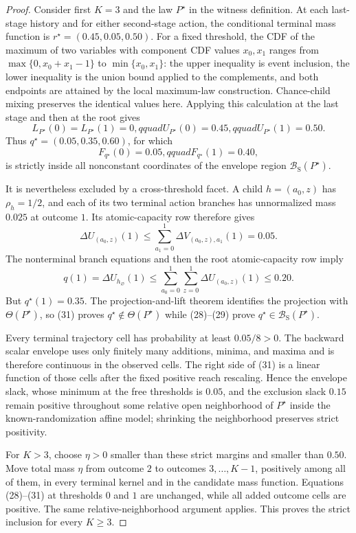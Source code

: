 \documentclass{article}
\begin{document}
\begin{proof}
Consider first \(K=3\) and the law \(P^\star\) in the witness definition.  At each last-stage history and for either second-stage action, the conditional terminal mass function is \(r^\star=(0.45,0.05,0.50)\).  For a fixed threshold, the CDF of the maximum of two variables with component CDF values \(x_0,x_1\) ranges from \(\max\{0,x_0+x_1-1\}\) to \(\min\{x_0,x_1\}\): the upper inequality is event inclusion, the lower inequality is the union bound applied to the complements, and both endpoints are attained by the local maximum-law construction.  Chance-child mixing preserves the identical values here.  Applying this calculation at the last stage and then at the root gives
\[
 L_{P^\star}(0)=L_{P^\star}(1)=0,qquad
 U_{P^\star}(0)=0.45,qquad U_{P^\star}(1)=0.50.          \tag{28}
\]
Thus \(q^\star=(0.05,0.35,0.60)\), for which
\[
 F_{q^\star}(0)=0.05,qquad F_{q^\star}(1)=0.40,          \tag{29}
\]
is strictly inside all nonconstant coordinates of the envelope region \(\mathcal B_{\mathrm S}(P^\star)\).

It is nevertheless excluded by a cross-threshold facet.  A child \(h=(a_0,z)\) has \(\rho_h=1/2\), and each of its two terminal action branches has unnormalized mass \(0.025\) at outcome \(1\).  Its atomic-capacity row therefore gives
\[
 \Delta U_{(a_0,z)}(1)
 \leq\sum_{a_1=0}^1\Delta V_{(a_0,z),a_1}(1)=0.05.        \tag{30}
\]
The nonterminal branch equations and then the root atomic-capacity row imply
\[
 q(1)=\Delta U_{h_\varnothing}(1)
 \leq\sum_{a_0=0}^1\sum_{z=0}^1
       \Delta U_{(a_0,z)}(1)
 \leq0.20.                                                \tag{31}
\]
But \(q^\star(1)=0.35\).  The projection-and-lift theorem identifies the projection with \(\Theta(P^\star)\), so (31) proves \(q^\star\notin\Theta(P^\star)\) while (28)--(29) prove \(q^\star\in\mathcal B_{\mathrm S}(P^\star)\).

Every terminal trajectory cell has probability at least \(0.05/8>0\).  The backward scalar envelope uses only finitely many additions, minima, and maxima and is therefore continuous in the observed cells.  The right side of (31) is a linear function of those cells after the fixed positive reach rescaling.  Hence the envelope slack, whose minimum at the free thresholds is \(0.05\), and the exclusion slack \(0.15\) remain positive throughout some relative open neighborhood of \(P^\star\) inside the known-randomization affine model; shrinking the neighborhood preserves strict positivity.

For \(K>3\), choose \(\eta>0\) smaller than these strict margins and smaller than \(0.50\).  Move total mass \(\eta\) from outcome \(2\) to outcomes \(3,\ldots,K-1\), positively among all of them, in every terminal kernel and in the candidate mass function.  Equations (28)--(31) at thresholds \(0\) and \(1\) are unchanged, while all added outcome cells are positive.  The same relative-neighborhood argument applies.  This proves the strict inclusion for every \(K\geq3\).
\end{proof}
\end{document}
